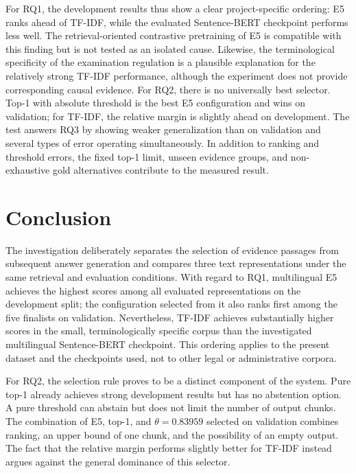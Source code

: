 \documentclass[11pt]{article}
\begin{document}
For RQ1, the development results thus show a clear project-specific ordering: E5 ranks ahead of TF-IDF, while the evaluated Sentence-BERT checkpoint performs less well. The retrieval-oriented contrastive pretraining of E5 is compatible with this finding but is not tested as an isolated cause. Likewise, the terminological specificity of the examination regulation is a plausible explanation for the relatively strong TF-IDF performance, although the experiment does not provide corresponding causal evidence. For RQ2, there is no universally best selector. Top-1 with absolute threshold is the best E5 configuration and wins on validation; for TF-IDF, the relative margin is slightly ahead on development. The test answers RQ3 by showing weaker generalization than on validation and several types of error operating simultaneously. In addition to ranking and threshold errors, the fixed top-1 limit, unseen evidence groups, and non-exhaustive gold alternatives contribute to the measured result.


\section{Conclusion}

The investigation deliberately separates the selection of evidence passages from subsequent answer generation and compares three text representations under the same retrieval and evaluation conditions. With regard to RQ1, multilingual E5 achieves the highest scores among all evaluated representations on the development split; the configuration selected from it also ranks first among the five finalists on validation. Nevertheless, TF-IDF achieves substantially higher scores in the small, terminologically specific corpus than the investigated multilingual Sentence-BERT checkpoint. This ordering applies to the present dataset and the checkpoints used, not to other legal or administrative corpora.

For RQ2, the selection rule proves to be a distinct component of the system. Pure top-1 already achieves strong development results but has no abstention option. A pure threshold can abstain but does not limit the number of output chunks. The combination of E5, top-1, and $\theta=0.83959$ selected on validation combines ranking, an upper bound of one chunk, and the possibility of an empty output. The fact that the relative margin performs slightly better for TF-IDF instead argues against the general dominance of this selector.
\end{document}
